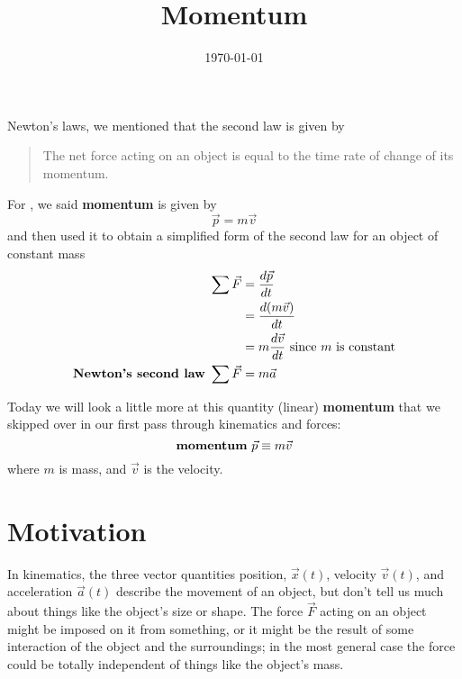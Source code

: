 \documentclass[handout]{tufte-handout}
\title{Momentum}
\date{\today}
\author{\mobeardInstructorShort}
\begin{document}
\maketitle
{}

 Newton's laws, we mentioned that the second law is given by
\begin{quotation}
The net force acting on an object is equal to the time rate of change of its momentum.
\end{quotation}
For \mobeardCourseName, we said \textbf{momentum} is given by
\begin{equation}
\vec{p} = m \vec{v}
\end{equation}
and then used it to obtain a simplified form of the second law for an object of constant mass
\begin{align}
\sum \vec{F} &= \dfrac{d \vec{p}}{d t} \\
&= \dfrac{d (m\vec{v})}{d t} \\
&= m \dfrac{d \vec{v}}{d t}\ \text{since $m$ is constant} \\
\text{\textbf{Newton's second law}}\ \sum \vec{F} &= m \vec{a}
\end{align}

Today we will look a little more at this quantity (linear) \textbf{momentum} that we skipped over in our first pass through kinematics and forces: 
\begin{equation}
\text{\textbf{momentum}}\ \vec{p} \equiv m \vec{v}
\end{equation}
where $m$ is mass, and $\vec{v}$ is the velocity. 

\section{Motivation}
In kinematics, the three vector quantities position, $\vec{x}(t)$, velocity $\vec{v}(t)$, and acceleration $\vec{a}(t)$ describe the movement of an object, but don't tell us much about things like the object's size or shape. The force $\vec{F}$ acting on an object might be imposed on it from something, or it might be the result of some interaction of the object and the surroundings; in the most general case the force could be totally independent of things like the object's mass.
\end{document}
